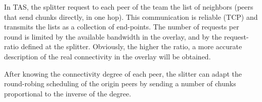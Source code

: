 In TAS, the splitter request to each peer of the team the list of neighbors (peers that send chunks directly, in one hop). This communication is reliable (TCP) and transmits the lists as a collection of end-points. The number of requests per round is limited by the available bandwidth in the overlay, and by the request-ratio defined at the splitter. Obviously, the higher the ratio, a more accurate description of the real connectivity in the overlay will be obtained.


After knowing the connectivity degree of each peer, the slitter can
adapt the round-robing scheduling of the origin peers by sending a
number of chunks proportional to the inverse of the degree.

